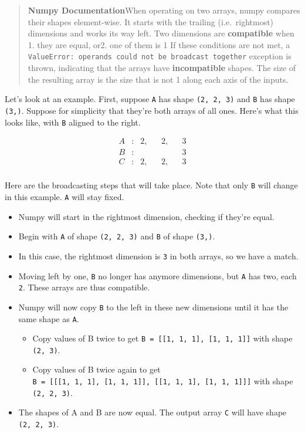 \documentclass[
  letterpaper,
  DIV=11,
  numbers=noendperiod]{scrreprt}
\providecommand{\tightlist}{%
  \setlength{\itemsep}{0pt}\setlength{\parskip}{0pt}}\usepackage{longtable,booktabs,array}
\begin{document}
\begin{quote}
\textbf{Numpy Documentation}When operating on two arrays, numpy compares
their shapes element-wise. It starts with the trailing (i.e.~rightmost)
dimensions and works its way left. Two dimensions are
\textbf{compatible} when 1. they are equal, or2. one of them is 1 If
these conditions are not met, a
\texttt{ValueError:\ operands\ could\ not\ be\ broadcast\ together}
exception is thrown, indicating that the arrays have
\textbf{incompatible} shapes. The size of the resulting array is the
size that is not 1 along each axis of the inputs.
\end{quote}

Let's look at an example. First, suppose \texttt{A} has shape
\texttt{(2,\ 2,\ 3)} and \texttt{B} has shape \texttt{(3,)}. Suppose for
simplicity that they're both arrays of all ones. Here's what this looks
like, with \texttt{B} aligned to the right.

\begin{align*}
A &:& 2, & & 2, & & 3 \\
B &:&   & &   & & 3 \\
\hline
C &:& 2, & & 2, & & 3 \\
\end{align*}

Here are the broadcasting steps that will take place. Note that only
\texttt{B} will change in this example. \texttt{A} will stay fixed.

\begin{itemize}
\tightlist
\item
  Numpy will start in the rightmost dimension, checking if they're
  equal.
\item
  Begin with \texttt{A} of shape \texttt{(2,\ 2,\ 3)} and \texttt{B} of
  shape \texttt{(3,)}.
\item
  In this case, the rightmost dimension is \texttt{3} in both arrays, so
  we have a match.
\item
  Moving left by one, \texttt{B} no longer has anymore dimensions, but
  \texttt{A} has two, each \texttt{2}. These arrays are thus compatible.
\item
  Numpy will now copy \texttt{B} to the left in these new dimensions
  until it has the same shape as \texttt{A}.

  \begin{itemize}
  \tightlist
  \item
    Copy values of B twice to get
    \texttt{B\ =\ {[}{[}1,\ 1,\ 1{]},\ {[}1,\ 1,\ 1{]}{]}} with shape
    \texttt{(2,\ 3)}.
  \item
    Copy values of B twice again to get
    \texttt{B\ =\ {[}{[}{[}1,\ 1,\ 1{]},\ {[}1,\ 1,\ 1{]}{]},\ {[}{[}1,\ 1,\ 1{]},\ {[}1,\ 1,\ 1{]}{]}{]}}
    with shape \texttt{(2,\ 2,\ 3)}.
  \end{itemize}
\item
  The shapes of A and B are now equal. The output array \texttt{C} will
  have shape \texttt{(2,\ 2,\ 3)}.
\end{itemize}
\end{document}
